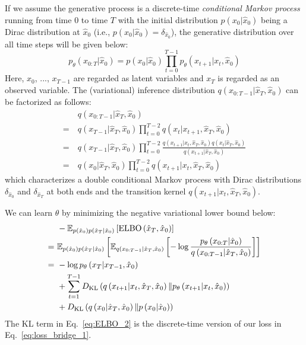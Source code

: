 If we assume the generative process is a discrete-time \emph{conditional
Markov process} running from time $0$ to time $T$ with the initial
distribution $p\left(x_{0}|\hat{x}_{0}\right)$ being a Dirac distribution
at $\hat{x}_{0}$ (i.e., $p\left(x_{0}|\hat{x}_{0}\right)=\delta_{\hat{x}_{0}}$),
the generative distribution over all time steps will be given below:
\begin{equation}
p_{\theta}\left(x_{0:T}|\hat{x}_{0}\right)=p\left(x_{0}|\hat{x}_{0}\right)\prod_{t=0}^{T-1}p_{\theta}\left(x_{t+1}|x_{t},\hat{x}_{0}\right)
\end{equation}
Here, $x_{0}$, ..., $x_{T-1}$ are regarded as latent variables and
$x_{T}$ is regarded as an observed variable. The (variational) inference
distribution $q\left(x_{0:T-1}|\hat{x}_{T},\hat{x}_{0}\right)$ can
be factorized as follows:
\begin{align}
 & q\left(x_{0:T-1}|\hat{x}_{T},\hat{x}_{0}\right)\nonumber \\
=\  & q\left(x_{T-1}|\hat{x}_{T},\hat{x}_{0}\right)\prod_{t=0}^{T-2}q\left(x_{t}|x_{t+1},\hat{x}_{T},\hat{x}_{0}\right)\\
=\  & q\left(x_{T-1}|\hat{x}_{T},\hat{x}_{0}\right)\prod_{t=0}^{T-2}\frac{q\left(x_{t+1}|x_{t},\hat{x}_{T},\hat{x}_{0}\right)q\left(x_{t}|\hat{x}_{T},\hat{x}_{0}\right)}{q\left(x_{t+1}|\hat{x}_{T},\hat{x}_{0}\right)}\\
=\  & q\left(x_{0}|\hat{x}_{T},\hat{x}_{0}\right)\prod_{t=0}^{T-2}q\left(x_{t+1}|x_{t},\hat{x}_{T},\hat{x}_{0}\right)
\end{align}
which characterizes a double conditional Markov process with Dirac
distributions $\delta_{\hat{x}_{0}}$ and $\delta_{\hat{x}_{T}}$
at both ends and the transition kernel $q\left(x_{t+1}|x_{t},\hat{x}_{T},\hat{x}_{0}\right)$.

We can learn $\theta$ by minimizing the negative variational lower
bound below:
\begin{align}
 & -\mathbb{E}_{p\left(\hat{x}_{0}\right)p\left(\hat{x}_{T}|\hat{x}_{0}\right)}\left[\text{ELBO}\left(\hat{x}_{T},\hat{x}_{0}\right)\right]\nonumber \\
=\  & \mathbb{E}_{p\left(\hat{x}_{0}\right)p\left(\hat{x}_{T}|\hat{x}_{0}\right)}\left[\mathbb{E}_{q\left(x_{0:T-1}|\hat{x}_{T},\hat{x}_{0}\right)}\left[-\log\frac{p_{\theta}\left(x_{0:T}|\hat{x}_{0}\right)}{q\left(x_{0:T-1}|\hat{x}_{T},\hat{x}_{0}\right)}\right]\right]\\
=\  & -\log p_{\theta}\left(x_{T}|x_{T-1},\hat{x}_{0}\right)\nonumber \\
 & +\sum_{t=1}^{T-1}D_{\text{KL}}\left(q\left(x_{t+1}|x_{t},\hat{x}_{T},\hat{x}_{0}\right)\|p_{\theta}\left(x_{t+1}|x_{t},\hat{x}_{0}\right)\right)\nonumber \\
 & +D_{\text{KL}}\left(q\left(x_{0}|\hat{x}_{T},\hat{x}_{0}\right)\|p\left(x_{0}|\hat{x}_{0}\right)\right)\label{eq:ELBO_2}
\end{align}
The KL term in Eq.~\ref{eq:ELBO_2} is the discrete-time version
of our loss in Eq.~\ref{eq:loss_bridge_1}.

